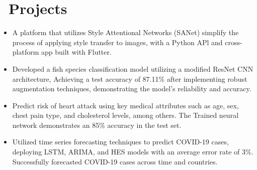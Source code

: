 \section{\texorpdfstring{\faTasks}{}\ Projects}
\begin{itemize}[parsep=0.5ex]
      \item \textbf{}
            \newline A platform that utilizes Style Attentional Networks (SANet) simplify the process of applying style transfer to images, with a Python APl and cross-platform app built with Flutter.
      \item \textbf{}
            \newline Developed a fish species classification model utilizing a modified ResNet CNN architecture, Achieving a test accuracy of 87.11\% after implementing robust augmentation techniques, demonstrating the model's reliability and accuracy.
      \item \textbf{}
            \newline Predict risk of heart attack using key medical attributes such as age, sex, chest pain type, and cholesterol levels, among others. The Trained neural network demonstrates an 85\% accuracy in the test set.
      \item \textbf{}
            \newline Utilized time series forecasting techniques to predict COVID-19 cases, deploying LSTM, ARIMA, and HES models with an average error rate of 3\%. Successfully forecasted COVID-19 cases across time and countries.
\end{itemize}